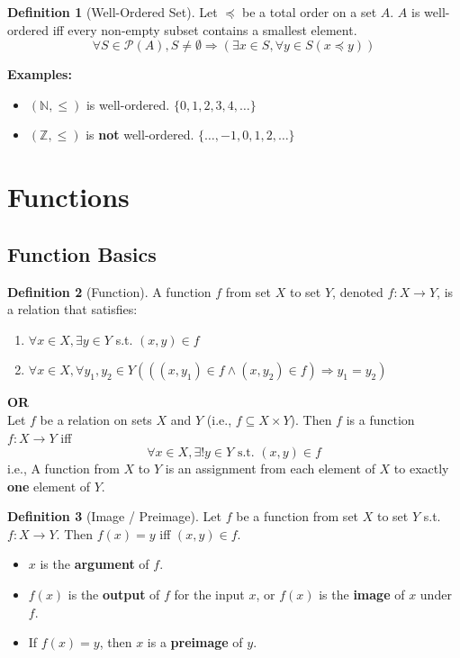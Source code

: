 \documentclass{article}
\theoremstyle{plain}
\theoremstyle{definition}
\newtheorem*{definition}{Definition}
\theoremstyle{remark}
\begin{document}
\begin{definition}[Well-Ordered Set]
    Let $\preceq$ be a total order on a set $A$. $A$ is well-ordered iff every non-empty subset contains a smallest element.
    \[ \forall S \in \mathcal{P}(A), S \neq \emptyset \Rightarrow (\exists x \in S, \forall y \in S (x \preceq y)) \]
\end{definition}

\textbf{Examples:}
\begin{itemize}
    \item $(\mathbb{N}, \leq)$ is well-ordered. $\{0, 1, 2, 3, 4, \dots\}$
    \item $(\mathbb{Z}, \leq)$ is \textbf{not} well-ordered. $\{\dots, -1, 0, 1, 2, \dots\}$
\end{itemize}

\section{Functions}

\subsection{Function Basics}

\begin{definition}[Function]
    A function $f$ from set $X$ to set $Y$, denoted $f: X \rightarrow Y$, is a relation that satisfies:
    \begin{enumerate}
        \item[(F1)] $\forall x \in X, \exists y \in Y$ s.t. $(x,y) \in f$
        \item[(F2)] $\forall x \in X, \forall y_1, y_2 \in Y (((x, y_1) \in f \wedge (x, y_2) \in f) \Rightarrow y_1 = y_2)$
    \end{enumerate}
    \textbf{OR}\\
    Let $f$ be a relation on sets $X$ and $Y$ (i.e., $f \subseteq X \times Y$). Then $f$ is a function $f: X \rightarrow Y$ iff
    \[ \forall x \in X, \exists! y \in Y \text{ s.t. } (x,y) \in f \]
    i.e., A function from $X$ to $Y$ is an assignment from each element of $X$ to exactly \textbf{one} element of $Y$.
\end{definition}

\begin{definition}[Image / Preimage]
    Let $f$ be a function from set $X$ to set $Y$ s.t. $f: X \rightarrow Y$. Then $f(x) = y$ iff $(x,y) \in f$.
    \begin{itemize}
        \item $x$ is the \textbf{argument} of $f$.
        \item $f(x)$ is the \textbf{output} of $f$ for the input $x$, or $f(x)$ is the \textbf{image} of $x$ under $f$.
        \item If $f(x) = y$, then $x$ is a \textbf{preimage} of $y$.
    \end{itemize}
\end{definition}
\end{document}

